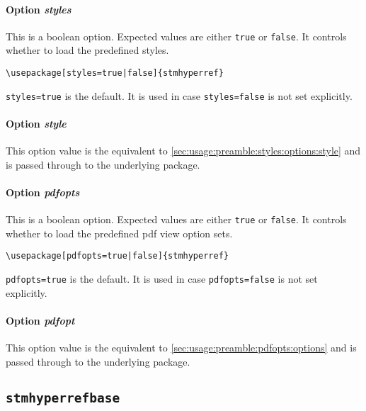 \documentclass[%
  type=article,%
  layout=koma,%
  conditionallox=true,%
  conditionalloxnewpage=false,%
  date=true,%
  index=true,%
  listings=true%
]{stmtext}
\begin{document}
\paragraph{Option \protect\textit{styles}} 
\label{sec:usage:preamble:wholepackage:options:styles}

This is a boolean option. Expected values are either \texttt{true} or \texttt{false}. It controls whether to load the predefined styles.

\begin{verbatim}
\usepackage[styles=true|false]{stmhyperref}
\end{verbatim}

\texttt{styles=true} is the default. It is used in case \texttt{styles=false} is not set explicitly.

\paragraph{Option \protect\textit{style}} 
\label{sec:usage:preamble:wholepackage:options:style}

This option value is the equivalent to \cref{sec:usage:preamble:styles:options:style} and is passed through to the underlying package.

\paragraph{Option \protect\textit{pdfopts}} 
\label{sec:usage:preamble:wholepackage:options:pdfopts}

This is a boolean option. Expected values are either \texttt{true} or \texttt{false}. It controls whether to load the predefined pdf view option sets.

\begin{verbatim}
\usepackage[pdfopts=true|false]{stmhyperref}
\end{verbatim}

\texttt{pdfopts=true} is the default. It is used in case \texttt{pdfopts=false} is not set explicitly.

\paragraph{Option \protect\textit{pdfopt}} 
\label{sec:usage:preamble:wholepackage:options:pdfopt}

This option value is the equivalent to \cref{sec:usage:preamble:pdfopts:options} and is passed through to the underlying package.

\subsection{\protect\texttt{stmhyperrefbase}}
\label{sec:usage:preamble:base}
\end{document}
